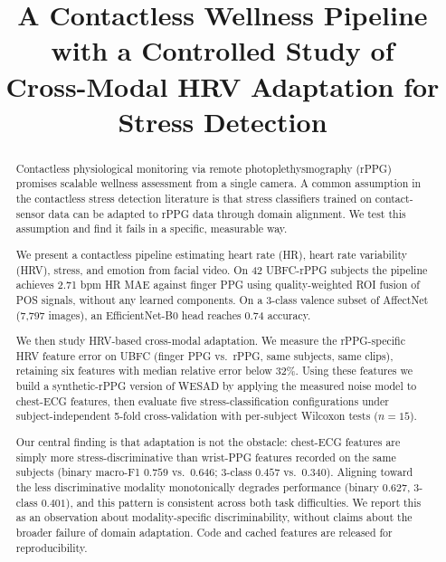 \documentclass[conference]{IEEEtran}
\begin{document}
\title{A Contactless Wellness Pipeline with a Controlled Study of\\
Cross-Modal HRV Adaptation for Stress Detection}

\author{
}

\maketitle

\begin{abstract}
Contactless physiological monitoring via remote photoplethysmography
(rPPG) promises scalable wellness assessment from a single camera. A
common assumption in the contactless stress detection literature is
that stress classifiers trained on contact-sensor data can be adapted
to rPPG data through domain alignment. We test this assumption and
find it fails in a specific, measurable way.

We present a contactless pipeline estimating heart rate (HR), heart
rate variability (HRV), stress, and emotion from facial video. On 42
UBFC-rPPG subjects the pipeline achieves 2.71 bpm HR MAE against
finger PPG using quality-weighted ROI fusion of POS signals, without
any learned components. On a 3-class valence subset of AffectNet
(7{,}797 images), an EfficientNet-B0 head reaches 0.74 accuracy.

We then study HRV-based cross-modal adaptation. We measure the
rPPG-specific HRV feature error on UBFC (finger PPG vs.\ rPPG, same
subjects, same clips), retaining six features with median relative
error below 32\%. Using these features we build a synthetic-rPPG
version of WESAD by applying the measured noise model to chest-ECG
features, then evaluate five stress-classification configurations
under subject-independent 5-fold cross-validation with per-subject
Wilcoxon tests ($n{=}15$).

Our central finding is that adaptation is not the obstacle: chest-ECG
features are simply more stress-discriminative than wrist-PPG features
recorded on the same subjects (binary macro-F1 $0.759$ vs.\ $0.646$;
3-class $0.457$ vs.\ $0.340$). Aligning toward the less discriminative
modality monotonically degrades performance (binary $0.627$, 3-class
$0.401$), and this pattern is consistent across both task difficulties.
We report this as an observation about modality-specific
discriminability, without claims about the broader failure of domain
adaptation. Code and cached features are released for reproducibility.
\end{abstract}
\end{document}
